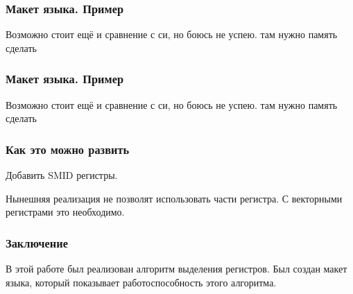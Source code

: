 \documentclass[10pt,a4paper]{beamer}
\begin{document}
\begin{frame}
    \frametitle{Макет языка. Пример}
    Возможно стоит ещё и сравнение с си, но боюсь не успею.
    там нужно память сделать
\end{frame}

\begin{frame}
    \frametitle{Макет языка. Пример}
    Возможно стоит ещё и сравнение с си, но боюсь не успею.
    там нужно память сделать
\end{frame}

\begin{frame}
    \frametitle{Как это можно развить}
    Добавить SMID регистры.

    Нынешняя реализация не позволят использовать части регистра.
    С векторными регистрами это необходимо.
\end{frame}

\begin{frame}
    \frametitle{Заключение}
    В этой работе был реализован алгоритм выделения регистров.
    Был создан макет языка, который показывает работоспособность этого алгоритма.
\end{frame}


\end{document}

